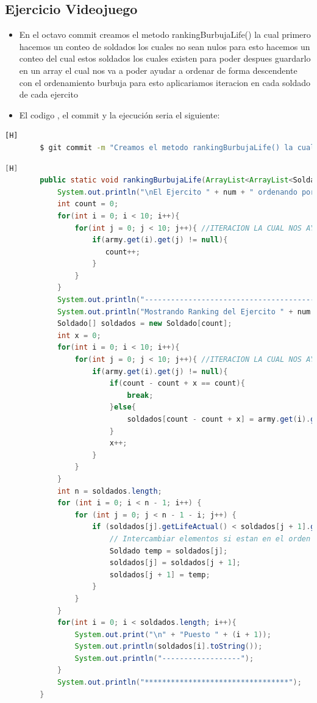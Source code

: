 \documentclass{article}
\begin{document}
	\subsection{Ejercicio Videojuego}
	\begin{itemize}	
		\item En el octavo commit creamos el metodo rankingBurbujaLife() la cual primero hacemos un conteo de soldados los cuales no sean nulos para esto hacemos un conteo del cual estos soldados los cuales existen para poder despues guardarlo en un array el cual nos va a poder ayudar a ordenar de forma descendente con el ordenamiento burbuja para esto aplicariamos iteracion en cada soldado de cada ejercito
		\item El codigo , el commit y la ejecución seria el siguiente:
	\end{itemize}	
	\begin{lstlisting}[language=bash,caption={Commit}][H]
		$ git commit -m "Creamos el metodo rankingBurbujaLife() la cual primero hacemos un conteo de soldados los cuales no sean nulos para esto hacemos un conteo del cual estos soldados los cuales existen para poder despues guardarlo en un array el cual nos va a poder ayudar a ordenar de forma descendente con el ordenamiento burbuja para esto aplicariamos iteracion en cada soldado de cada ejercito"
	\end{lstlisting}	
	\begin{lstlisting}[language=java,caption={Las lineas de codigos del metodo creado:}][H]
		public static void rankingBurbujaLife(ArrayList<ArrayList<Soldado>> army , int num){
			System.out.println("\nEl Ejercito " + num + " ordenando por metodo burbuja: ");
			int count = 0;
			for(int i = 0; i < 10; i++){
				for(int j = 0; j < 10; j++){ //ITERACION LA CUAL NOS AYUDA A PASAR POR TODOS LOS SOLDADOS DE CADA EJERCITO
					if(army.get(i).get(j) != null){ 
					   count++;
					}
				}
			}
			System.out.println("------------------------------------------");
			System.out.println("Mostrando Ranking del Ejercito " + num + " ..... ////// --->");
			Soldado[] soldados = new Soldado[count];
			int x = 0;
			for(int i = 0; i < 10; i++){
				for(int j = 0; j < 10; j++){ //ITERACION LA CUAL NOS AYUDA A PASAR POR TODOS LOS SOLDADOS AL ARRAY SOLDADO PARA PODER USAR EL USO DEL METODO DE ORDENACION BURBUJA
					if(army.get(i).get(j) != null){ 
						if(count - count + x == count){
							break;
						}else{
							soldados[count - count + x] = army.get(i).get(j);
						}
						x++;   
					}
				}
			}
			int n = soldados.length;
			for (int i = 0; i < n - 1; i++) {
				for (int j = 0; j < n - 1 - i; j++) {
					if (soldados[j].getLifeActual() < soldados[j + 1].getLifeActual()) {
						// Intercambiar elementos si estan en el orden incorrecto
						Soldado temp = soldados[j];
						soldados[j] = soldados[j + 1];
						soldados[j + 1] = temp;
					}
				}
			}
			for(int i = 0; i < soldados.length; i++){
				System.out.print("\n" + "Puesto " + (i + 1));
				System.out.println(soldados[i].toString());
				System.out.println("------------------");
			}
			System.out.println("*********************************");
		}

	\end{lstlisting}
\end{document}
